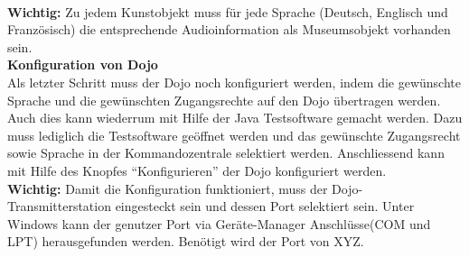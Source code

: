 \\[4mm]
\textbf{Wichtig:} Zu jedem Kunstobjekt muss für jede Sprache (Deutsch, Englisch und Französisch) die entsprechende Audioinformation als Museumsobjekt vorhanden sein.
\\[4mm]
\textbf{Konfiguration von Dojo}
\\[4mm]
Als letzter Schritt muss der Dojo noch konfiguriert werden, indem die gewünschte Sprache und die gewünschten Zugangsrechte auf den Dojo übertragen werden. Auch dies kann wiederrum mit Hilfe der Java Testsoftware gemacht werden. Dazu muss lediglich die Testsoftware geöffnet werden und das gewünschte Zugangsrecht sowie Sprache in der Kommandozentrale selektiert werden. Anschliessend kann mit Hilfe des Knopfes ``Konfigurieren'' der Dojo konfiguriert werden.
\\[4mm]
\textbf{Wichtig:} Damit die Konfiguration funktioniert, muss der Dojo-Transmitterstation eingesteckt sein und dessen Port selektiert sein. Unter Windows kann der genutzer Port via Geräte-Manager Anschlüsse(COM und LPT) herausgefunden werden. Benötigt wird der Port von XYZ.
